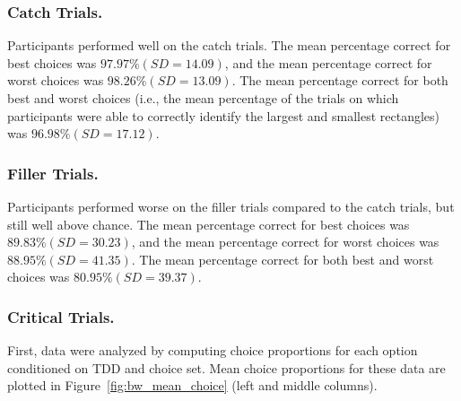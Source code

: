 \subsubsection{Catch Trials.}
Participants performed well on the catch trials. The mean percentage correct for best choices was $97.97\% (SD=14.09)$, and the mean percentage correct for worst choices was $98.26\% (SD=13.09)$. The mean percentage correct for both best and worst choices (i.e., the mean percentage of the trials on which participants were able to correctly identify the largest and smallest rectangles) was $96.98\% (SD=17.12)$. 

\subsubsection{Filler Trials.}
Participants performed worse on the filler trials compared to the catch trials, but still well above chance. The mean percentage correct for best choices was $89.83\% (SD=30.23)$, and the mean percentage correct for worst choices was $88.95\% (SD=41.35)$. The mean percentage correct for both best and worst choices was $80.95\% (SD=39.37)$. 

\subsubsection{Critical Trials.}



First, data were analyzed by computing choice proportions for each option conditioned on TDD and choice set. Mean choice proportions for these data are plotted in Figure~\ref{fig:bw_mean_choice} (left and middle columns). 

